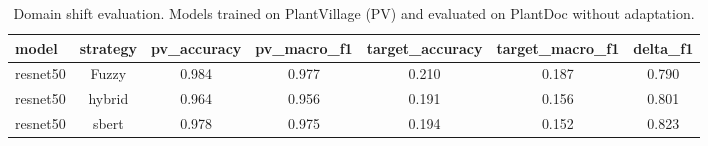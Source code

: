 \begin{table}[htbp]
\caption{Domain shift evaluation. Models trained on PlantVillage (PV) and evaluated on PlantDoc without adaptation.}
\label{tab:domain_shift}
\begin{tabular}{lcccccc}
\toprule
model & strategy & pv\_accuracy & pv\_macro\_f1 & target\_accuracy & target\_macro\_f1 & delta\_f1 \\
\midrule
resnet50 & Fuzzy & 0.984 & 0.977 & 0.210 & 0.187 & 0.790 \\
resnet50 & hybrid & 0.964 & 0.956 & 0.191 & 0.156 & 0.801 \\
resnet50 & sbert & 0.978 & 0.975 & 0.194 & 0.152 & 0.823 \\
\bottomrule
\end{tabular}
\end{table}
